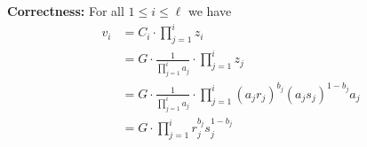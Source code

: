 {\bf Correctness:}  For all $1 \leq i \leq \ell$ we have
\begin{equation}
\begin{aligned}
v_i &= C_i \cdot \prod_{j=1}^{i} z_i \\
&= G \cdot \frac{1}{\prod_{j=1}^{i} a_j} \cdot \prod_{j=1}^{i} z_j \\
&= G \cdot \frac{1}{\prod_{j=1}^{i} a_j} \cdot \prod_{j=1}^{i} (a_jr_j)^{b_j}(a_js_j)^{1-b_j} a_j \\
&= G \cdot \prod_{j=1}^{i} r_j^{b_j}s_j^{1-b_j}
\end{aligned}
\end{equation}



